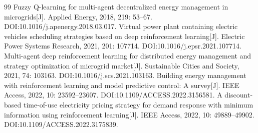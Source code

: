 \documentclass[UTF8,a4paper,11pt]{ctexart}
\begin{document}
\begin{thebibliography}{99}
 Fuzzy Q-learning for multi-agent decentralized energy management in microgrids[J]. Applied Energy, 2018, 219: 53--67. DOI:10.1016/j.apenergy.2018.03.017.
 Virtual power plant containing electric vehicles scheduling strategies based on deep reinforcement learning[J]. Electric Power Systems Research, 2021, 201: 107714. DOI:10.1016/j.epsr.2021.107714.
 Multi-agent deep reinforcement learning for distributed energy management and strategy optimization of microgrid market[J]. Sustainable Cities and Society, 2021, 74: 103163. DOI:10.1016/j.scs.2021.103163.
 Building energy management with reinforcement learning and model predictive control: A survey[J]. IEEE Access, 2022, 10: 23592--23607. DOI:10.1109/ACCESS.2022.3156581.
 A discount-based time-of-use electricity pricing strategy for demand response with minimum information using reinforcement learning[J]. IEEE Access, 2022, 10: 49889--49902. DOI:10.1109/ACCESS.2022.3175839.
\end{thebibliography}
\end{document}
